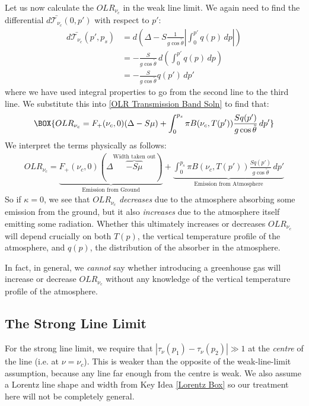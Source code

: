 Let us now calculate the $OLR_{\nu_c}$ in the weak line limit. We again need to find the differential $d\bar{\mathcal{T}_{\nu_c}}(0,p')$ with respect to $p'$:
\begin{align*}
    d\bar{\mathcal{T}_{\nu_c}}(p',p_s)&=d\left( 
        \Delta - S\frac{1}{g\cos\tilde{\theta}}\left|
            \int_{0}^{p'}q(p)\,dp
        \right|
     \right)\\
     &= -\frac{S}{g\cos\tilde{\theta}}\,d\left( 
        \int_{0}^{p'}q(p)\,dp
      \right)
     \\
     &= -\frac{S}{g\cos\tilde{\theta}}q(p')\,dp'
\end{align*}
where we have used integral properties to go from the second line to the third line. We substitute this into \ref{OLR Transmission Band Soln} to find that: 
\begin{align}
    \label{Weak OLR}
    \BOX{OLR_{\nu_c}
    =F_+(\nu_c,0)(\Delta-S\mu)+\int_{0}^{p_s}\pi B(\nu_c,T(p'))\frac{Sq(p')}{g\cos\tilde{\theta}}\,dp'}
\end{align}
We interpret the terms physically as follows:
\begin{align*}
    OLR_{\nu_c}
    =\underbrace{F_+(\nu_c,0)(\Delta\overbrace{-S\mu}^{\text{Width taken out}})}_{\text{Emission from Ground}}
    +\underbrace{\int_{0}^{p_s}\pi B(\nu_c,T(p'))\frac{Sq(p')}{g\cos\tilde{\theta}}\,dp'}_{\text{Emission from Atmosphere}}
\end{align*}
So if $\kappa=0$, we see that $OLR_{\nu_c}$ \textit{decreases} due to the atmosphere absorbing some emission from the ground, but it also \textit{increases} due to the atmosphere itself emitting some radiation. Whether this ultimately increases or decreases $OLR_{\nu_c}$ will depend crucially on both $T(p)$, the vertical temperature profile of the atmosphere, and $q(p)$, the distribution of the absorber in the atmosphere.

In fact, in general, we \textit{cannot} say whether introducing a greenhouse gas will increase or decrease $OLR_{\nu_c}$ without any knowledge of the vertical temperature profile of the atmosphere.

\subsection{The Strong Line Limit}

For the strong line limit, we require that $|\tau_\nu(p_1)-\tau_\nu(p_2)|\gg 1$ at the \textit{centre} of the line (i.e. at $\nu=\nu_c$). This is weaker than the opposite of the weak-line-limit assumption, because any line far enough from the centre is weak. We also assume a Lorentz line shape and width from Key Idea \ref{Lorentz Box} so our treatment here will not be completely general.


